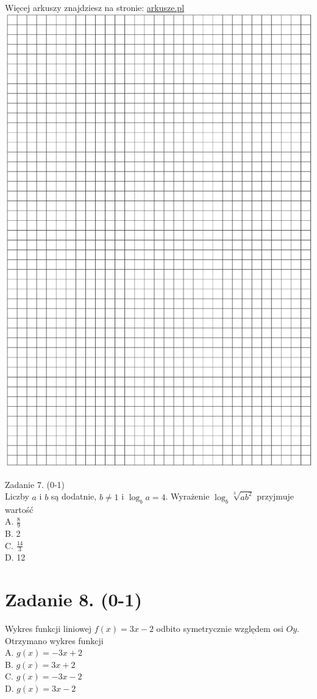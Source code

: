 \documentclass[10pt]{article}
\begin{document}
Więcej arkuszy znajdziesz na stronie: \href{http://arkusze.pl}{arkusze.pl}\\
\includegraphics[max width=\textwidth, center]{2024_11_21_4a1915d79134dda0750eg-03}

Zadanie 7. (0-1)\\
Liczby \(a\) i \(b\) są dodatnie, \(b \neq 1\) i \(\log _{b} a=4\). Wyrażenie \(\log _{b} \sqrt[3]{a b^{2}}\) przyjmuje wartość\\
A. \(\frac{8}{9}\)\\
B. 2\\
C. \(\frac{14}{3}\)\\
D. 12

\section*{Zadanie 8. (0-1)}
Wykres funkcji liniowej \(f(x)=3 x-2\) odbito symetrycznie względem osi \(O y\). Otrzymano wykres funkcji\\
A. \(g(x)=-3 x+2\)\\
B. \(g(x)=3 x+2\)\\
C. \(g(x)=-3 x-2\)\\
D. \(g(x)=3 x-2\)
\end{document}
